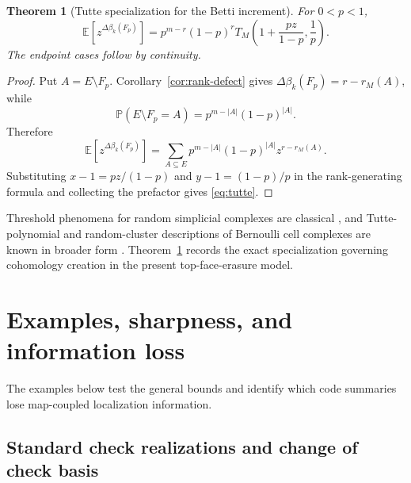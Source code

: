 \documentclass[11pt,letterpaper]{article}
\theoremstyle{plain}
\newtheorem{theorem}{Theorem}[section]
\theoremstyle{definition}
\newcommand{\E}{\mathbb{E}}
\newcommand{\Prob}{\mathbb{P}}
\newcommand{\1}{\mathbf{1}}
\newcommand{\abs}[1]{\left|#1\right|}
\begin{document}
\begin{theorem}[Tutte specialization for the Betti increment]\label{thm:tutte}
For $0<p<1$,
\begin{equation}\label{eq:tutte}
 \E\left[z^{\Delta\beta_k(F_p)}\right]
 =p^{m-r}(1-p)^r
 T_M\left(1+\frac{pz}{1-p},\frac1p\right).
\end{equation}
The endpoint cases follow by continuity.
\end{theorem}

\begin{proof}
Put $A=E\setminus F_p$.  Corollary~\ref{cor:rank-defect} gives
$\Delta\beta_k(F_p)=r-r_M(A)$, while
\[
 \Prob(E\setminus F_p=A)=p^{m-\abs A}(1-p)^{\abs A}.
\]
Therefore
\[
 \E[z^{\Delta\beta_k(F_p)}]
 =\sum_{A\subseteq E}p^{m-\abs A}(1-p)^{\abs A}z^{r-r_M(A)}.
\]
Substituting
$x-1=pz/(1-p)$ and $y-1=(1-p)/p$ in the rank-generating formula and collecting the
prefactor gives \eqref{eq:tutte}.
\end{proof}

Threshold phenomena for random simplicial complexes are classical
\cite{linialmeshulam2006,meshulamwallach2009}, and Tutte-polynomial and
random-cluster descriptions of Bernoulli cell complexes are known in broader form
\cite{hiraokashirai2016}.  Theorem~\ref{thm:tutte} records the exact
specialization governing cohomology creation in the present top-face-erasure model.

\section{Examples, sharpness, and information loss}\label{sec:examples}

The examples below test the general bounds and identify which code summaries lose
map-coupled localization information.

\subsection{Standard check realizations and change of check basis}
\end{document}
